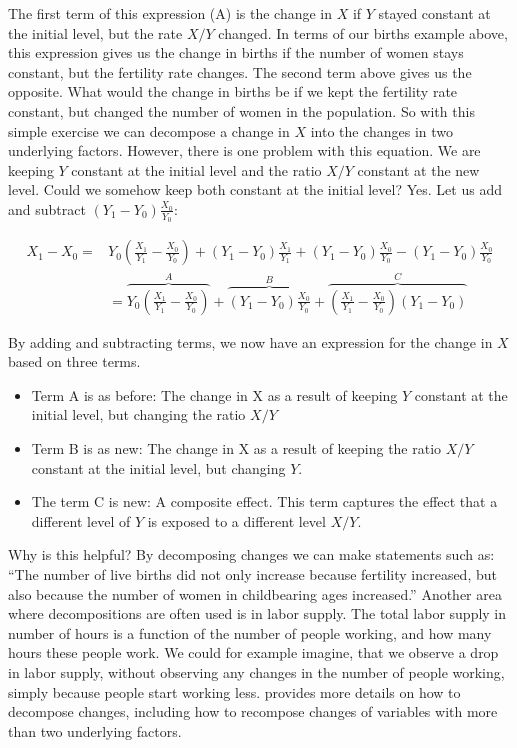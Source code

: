 \documentclass[]{book}
\providecommand{\tightlist}{%
  \setlength{\itemsep}{0pt}\setlength{\parskip}{0pt}}
\begin{document}
The first term of this expression (A) is the change in \(X\) if \(Y\) stayed constant at the initial level, but the rate \(X/Y\) changed. In terms of our births example above, this expression gives us the change in births if the number of women stays constant, but the fertility rate changes. The second term above gives us the opposite. What would the change in births be if we kept the fertility rate constant, but changed the number of women in the population. So with this simple exercise we can decompose a change in \(X\) into the changes in two underlying factors. However, there is one problem with this equation. We are keeping \(Y\) constant at the initial level and the ratio \(X/Y\) constant at the new level. Could we somehow keep both constant at the initial level? Yes. Let us add and subtract \((Y_1-Y_0)\frac{X_0}{Y_0}\):

\begin{align}
   X_1-X_0=&Y_0\left(\frac{X_1}{Y_1}-\frac{X_0}{Y_0}\right)+(Y_1-Y_0)\frac{X_1}{Y_1}+(Y_1-Y_0)\frac{X_0}{Y_0}-(Y_1-Y_0)\frac{X_0}{Y_0}\nonumber\\
&=\overbrace{Y_0\left(\frac{X_1}{Y_1}-\frac{X_0}{Y_0}\right)}^{A}+\overbrace{\left(Y_1-Y_0\right)\frac{X_0}{Y_0}}^{B}+
  \overbrace{\left(\frac{X_1}{Y_1}-\frac{X_0}{Y_0}\right)\left(Y_1-Y_0\right)}^{C}
 \end{align}

By adding and subtracting terms, we now have an expression for the change in \(X\) based on three terms.

\begin{itemize}
\tightlist
\item
  Term A is as before: The change in X as a result of keeping \(Y\) constant at the initial level, but changing the ratio \(X/Y\)
\item
  Term B is as new: The change in X as a result of keeping the ratio \(X/Y\) constant at the initial level, but changing \(Y\).
\item
  The term C is new: A composite effect. This term captures the effect that a different level of \(Y\) is exposed to a different level \(X/Y\).
\end{itemize}

Why is this helpful? By decomposing changes we can make statements such as: ``The number of live births did not only increase because fertility increased, but also because the number of women in childbearing ages increased.'' Another area where decompositions are often used is in labor supply. The total labor supply in number of hours is a function of the number of people working, and how many hours these people work. We could for example imagine, that we observe a drop in labor supply, without observing any changes in the number of people working, simply because people start working less. \citep{csr} provides more details on how to decompose changes, including how to recompose changes of variables with more than two underlying factors.
\end{document}
